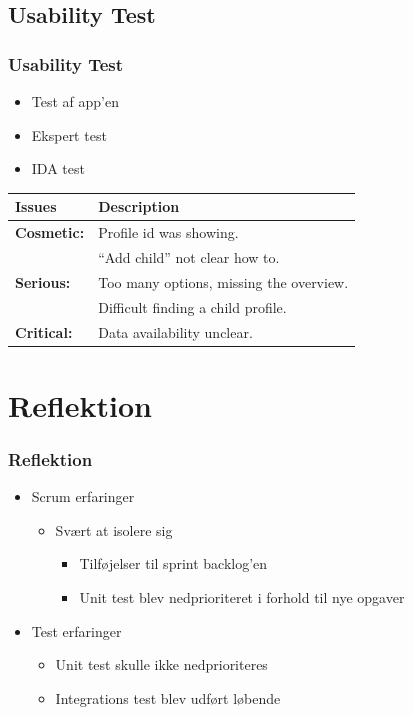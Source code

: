 \documentclass{beamer}
\begin{document}
\subsection{Usability Test}

\begin{frame}
	\frametitle{Usability Test}
	\begin{itemize}
		\item Test af app'en
		\item Ekspert test
		\item IDA test
	\end{itemize}
	\begin{table}[!h]
	\centering
		\begin{tabular}{| p{2cm} | m{7cm} |}
			\hline
			\textbf{Issues} 	& \textbf{Description} \\ \hline
			
			\textbf{Cosmetic:}	& Profile id was showing. \\ 
								& ``Add child'' not clear how to. \\ \hline
							
			\textbf{Serious:}	& Too many options, missing the overview. \\
								& Difficult finding a child profile. \\ \hline
						
			\textbf{Critical:} 	& Data availability unclear. \\ \hline
		\end{tabular}
	\label{tab:usability_test_results}
\end{table}
\end{frame}

\section{Reflektion}

\begin{frame}
	\frametitle{Reflektion}
	\begin{itemize}
		\item Scrum erfaringer
		\begin{itemize}
			\item Sv\ae{}rt at isolere sig
			\begin{itemize}
				\item Tilf\o{}jelser til sprint backlog'en
				\item Unit test blev nedprioriteret i forhold til nye opgaver
			\end{itemize}
		\end{itemize}
		\item Test erfaringer
		\begin{itemize}
			\item Unit test skulle ikke nedprioriteres
			\item Integrations test blev udf\o{}rt l\o{}bende
		\end{itemize}
		
	\end{itemize}
\end{frame}
\end{document}
